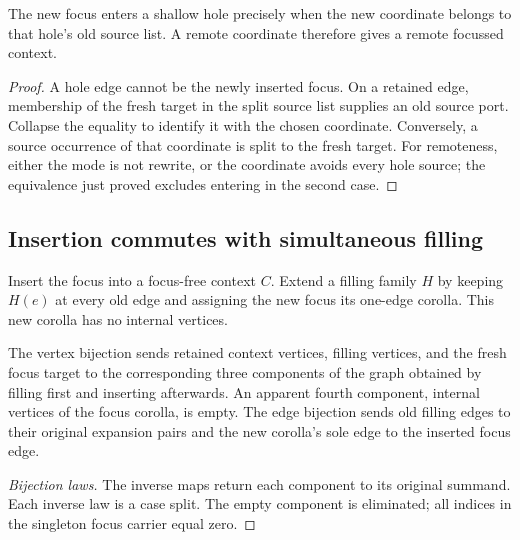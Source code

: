 




\begin{lemma}
The new focus enters a shallow hole precisely when the new coordinate belongs
to that hole's old source list. A remote coordinate therefore gives a remote
focussed context.
\end{lemma}
\begin{proof}
A hole edge cannot be the newly inserted focus. On a retained edge, membership
of the fresh target in the split source list supplies an old source port.
Collapse the equality to identify it with the chosen coordinate. Conversely,
a source occurrence of that coordinate is split to the fresh target. For
remoteness, either the mode is not rewrite, or the coordinate avoids every
hole source; the equivalence just proved excludes entering in the second case.
\end{proof}



\subsection{Insertion commutes with simultaneous filling}
\begin{definition}
Insert the focus into a focus-free context $C$. Extend a filling family $H$ by
keeping $H(e)$ at every old edge and assigning the new focus its one-edge
corolla. This new corolla has no internal vertices.
\end{definition}



\begin{definition}
The vertex bijection sends retained context vertices, filling vertices, and the
fresh focus target to the corresponding three components of the graph obtained
by filling first and inserting afterwards. An apparent fourth component,
internal vertices of the focus corolla, is empty. The edge bijection sends old
filling edges to their original expansion pairs and the new corolla's sole
edge to the inserted focus edge.
\end{definition}
\begin{proof}[Bijection laws]
The inverse maps return each component to its original summand. Each inverse
law is a case split. The empty component is eliminated; all indices in the
singleton focus carrier equal zero.
\end{proof}

